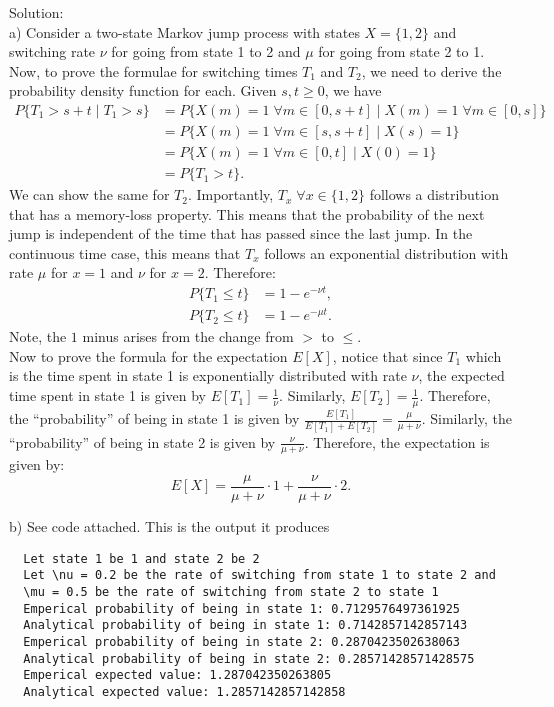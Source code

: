 \documentclass[a4paper,notitlepage,cs4size,cap,indent,oneside,12pt]{article}
\numberwithin{equation}{section}
\numberwithin{figure}{section}
\newcommand{\blue}{\color{blue}}
\begin{document}
{\blue
\noindent Solution: \\
a) Consider a two-state Markov jump process with states $X = \{1, 2\}$ and switching rate $\nu$ for going from state 1 to 2 and $\mu$ for going from state 2 to 1. Now, to prove the formulae for switching times $T_1$ and $T_2$, we need to derive the probability density function for each. Given $s,t \ge 0$, we have
\begin{align*}
  P\{T_1 > s+t\;|\; T_1 > s\} &= P\{X(m) = 1\; \forall m \in [0, s+t]\; |\; X(m) = 1\; \forall m \in [0, s]\}\\
  &= P\{X(m) = 1\; \forall m \in [s, s+t]\; |\; X(s) = 1\} \tag{Markov property}\\
  &= P\{X(m) = 1\; \forall m \in [0, t]\;|\; X(0) = 1\} \tag{Time Homogenity}\\
  &= P\{T_1 > t\}.
\end{align*}
We can show the same for $T_2$. Importantly, $T_x\; \forall x \in \{1,2\}$ follows a distribution that has a memory-loss property. This means that the probability of the next jump is independent of the time that has passed since the last jump. In the continuous time case, this means that $T_x$ follows an exponential distribution with rate $\mu$ for $x = 1$ and $\nu$ for $x = 2$. Therefore:
\begin{align*}
  P\{T_1 \leq t\} &= 1 - e^{-\nu t},\\
  P\{T_2 \leq t\} &= 1 - e^{-\mu t}.
\end{align*}
Note, the $1$ minus arises from the change from $>$ to $\leq$. \\

Now to prove the formula for the expectation $E[X]$, notice that since $T_1$ which is the time spent in state 1 is exponentially distributed with rate $\nu$, the expected time spent in state 1 is given by $E[T_1] = \frac{1}{\nu}$. Similarly, $E[T_2] = \frac{1}{\mu}$. Therefore, the  ``probability'' of being in state 1 is given by $\frac{E[T_1]}{E[T_1] + E[T_2]} = \frac{\mu}{\mu + \nu}$. Similarly, the ``probability'' of being in state 2 is given by $\frac{\nu}{\mu + \nu}$. Therefore, the expectation is given by:
\begin{equation*}
  E[X] = \frac{\mu}{\mu + \nu} \cdot 1 + \frac{\nu}{\mu + \nu} \cdot 2.
\end{equation*}

b) See code attached. This is the output it produces
\begin{verbatim}
  Let state 1 be 1 and state 2 be 2
  Let \nu = 0.2 be the rate of switching from state 1 to state 2 and
  \mu = 0.5 be the rate of switching from state 2 to state 1
  Emperical probability of being in state 1: 0.7129576497361925
  Analytical probability of being in state 1: 0.7142857142857143
  Emperical probability of being in state 2: 0.2870423502638063
  Analytical probability of being in state 2: 0.28571428571428575
  Emperical expected value: 1.287042350263805
  Analytical expected value: 1.2857142857142858
\end{verbatim}
}
\end{document}
